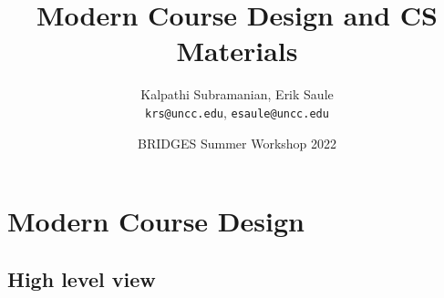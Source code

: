 \documentclass[aspectratio=169]{beamer}
\title{Modern Course Design and CS Materials}
\subtitle{}
\author{Kalpathi Subramanian, Erik Saule\\\texttt{krs@uncc.edu}, \texttt{esaule@uncc.edu}}
\institute{The University of North Carolina at Charlotte}
\date{BRIDGES Summer Workshop 2022}
\begin{document}
\begin{frame}
\titlepage
\end{frame}




\section{Modern Course Design}

\subsection{High level view}
\end{document}
